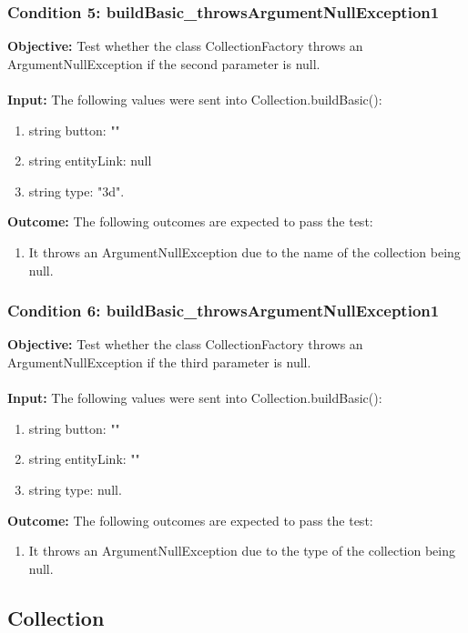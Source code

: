 \documentclass[a4paper,12pt]{article}
\begin{document}
		\subsubsection{Condition 5: buildBasic\_throwsArgumentNullException1}
			\textbf{Objective:} Test whether the class CollectionFactory throws an ArgumentNullException if the second parameter is null.\\\\
			\textbf{Input:} The following values were sent into Collection.buildBasic():
				\begin{enumerate}
					\item string button: ""
					\item string entityLink: null
					\item string type: "3d".\\
				\end{enumerate}
			\textbf{Outcome:} The following outcomes are expected to pass the test:
				\begin{enumerate}
					\item It throws an ArgumentNullException due to the name of the collection being null.
				\end{enumerate}
				
		\subsubsection{Condition 6: buildBasic\_throwsArgumentNullException1}
			\textbf{Objective:} Test whether the class CollectionFactory throws an ArgumentNullException if the third parameter is null.\\\\
			\textbf{Input:} The following values were sent into Collection.buildBasic():
				\begin{enumerate}
					\item string button: ""
					\item string entityLink: ""
					\item string type: null.\\
				\end{enumerate}
			\textbf{Outcome:} The following outcomes are expected to pass the test:
				\begin{enumerate}
					\item It throws an ArgumentNullException due to the type of the collection being null.
				\end{enumerate}
	\subsection{Collection}
\end{document}
